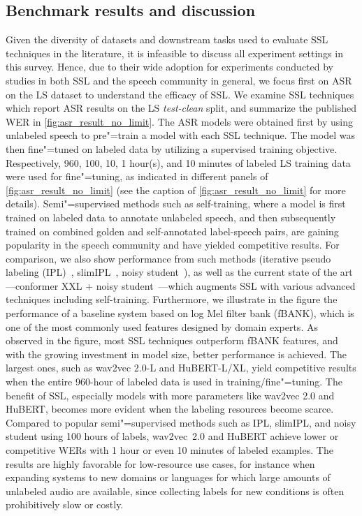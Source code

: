 \subsection{Benchmark results and discussion} \label{sec:benchmark} 
Given the diversity of datasets and downstream tasks used to evaluate SSL
techniques in the literature, it is infeasible to discuss all 
experiment settings in this survey. Hence, due to their wide adoption for
experiments conducted by studies in both SSL and the speech community in
general, we focus first on ASR on the LS dataset to understand the
efficacy of SSL. We examine SSL techniques which report ASR results on the LS
\textit{test-clean} split, and summarize the published WER in
\cref{fig:asr_result_no_limit}. The ASR models were obtained first by using
unlabeled speech to pre"=train a model with each SSL technique. The model was
then fine"=tuned on labeled data by utilizing a supervised training objective.
Respectively, 960, 100, 10, 1 hour(s), and 10 minutes of labeled LS training data
were used for fine"=tuning, as indicated in different panels of
\cref{fig:asr_result_no_limit} (see
the caption of \cref{fig:asr_result_no_limit} for more details).
Semi"=supervised methods such as self-training, where a model is first trained
on labeled data to annotate unlabeled speech, and then subsequently trained on
combined golden and self-annotated label-speech pairs, are gaining popularity
in the speech community and have yielded competitive results. For comparison, we also
show performance from such methods (iterative pseudo labeling 
(IPL)~\parencite{xu_iterative_2020}, slimIPL~\parencite{likhomanenko_slimipl_2021}, noisy 
student~\parencite{park_improved_2020}), as well as the current state of the art---conformer XXL + noisy
student~\parencite{zhang_pushing_2020}---which augments SSL with various advanced
techniques including self-training. Furthermore, we illustrate in the figure
the performance of a baseline system \parencite{yang_superb_2021} based on log Mel filter bank (fBANK), which is one of the most commonly used features designed by domain experts.
As observed in the figure, most SSL techniques outperform fBANK
features, and with the growing investment in model size, better performance is
achieved. The largest ones, such as wav2vec 2.0-L and HuBERT-L/XL, yield competitive results 
when the entire 960-hour of labeled data is used in
training/fine"=tuning. The benefit of SSL, especially models with more parameters
like wav2vec 2.0 and HuBERT, becomes more evident when the labeling resources
become scarce. Compared to popular semi"=supervised methods such as IPL,
slimIPL, and noisy student using 100 hours of labels, wav2vec~2.0 and HuBERT
achieve lower or competitive WERs with 1 hour or even 10 minutes of labeled
examples. The results are highly favorable for low-resource use cases, for instance when
expanding systems to new domains or languages for which large amounts of unlabeled
audio are available, since collecting labels for new conditions is often prohibitively
slow or costly.

